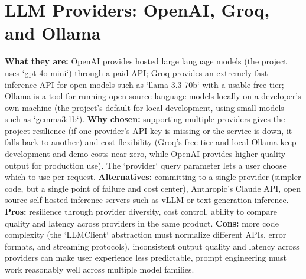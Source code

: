 \documentclass[11pt,a4paper]{report}
\begin{document}
\section{LLM Providers: OpenAI, Groq, and Ollama}
\textbf{What they are:} OpenAI provides hosted large language models (the project uses `gpt-4o-mini`) through a paid API; Groq provides an extremely fast inference API for open models such as `llama-3.3-70b` with a usable free tier; Ollama is a tool for running open source language models locally on a developer's own machine (the project's default for local development, using small models such as `gemma3:1b`).
\textbf{Why chosen:} supporting multiple providers gives the project resilience (if one provider's API key is missing or the service is down, it falls back to another) and cost flexibility (Groq's free tier and local Ollama keep development and demo costs near zero, while OpenAI provides higher quality output for production use). The `provider` query parameter lets a user choose which to use per request.
\textbf{Alternatives:} committing to a single provider (simpler code, but a single point of failure and cost center), Anthropic's Claude API, open source self hosted inference servers such as vLLM or text-generation-inference.
\textbf{Pros:} resilience through provider diversity, cost control, ability to compare quality and latency across providers in the same product.
\textbf{Cons:} more code complexity (the `LLMClient` abstraction must normalize different APIs, error formats, and streaming protocols), inconsistent output quality and latency across providers can make user experience less predictable, prompt engineering must work reasonably well across multiple model families.
\end{document}
